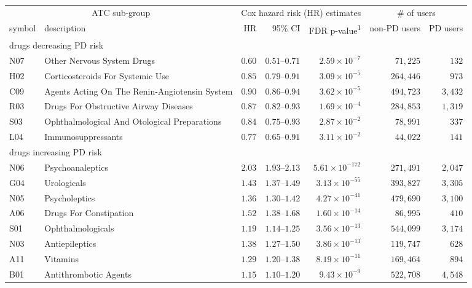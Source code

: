 \setlength{\LTpost}{0mm}
\begin{longtable}{llrrrrr}
\toprule
\multicolumn{2}{c}{ATC sub-group} & \multicolumn{3}{c}{Cox hazard risk (HR) estimates} & \multicolumn{2}{c}{\# of users} \\ 
\cmidrule(lr){1-2} \cmidrule(lr){3-5} \cmidrule(lr){6-7}
symbol & description & HR & 95\% CI & FDR p-value\textsuperscript{1} & non-PD users & PD users \\ 
\midrule
\multicolumn{7}{l}{drugs decreasing PD risk} \\ 
\midrule
N07 & Other Nervous System Drugs & $0.60$ & $0.51$–$0.71$ & $2.59 \times 10^{-7}$ & $71,225$ & $132$ \\ 
H02 & Corticosteroids For Systemic Use & $0.85$ & $0.79$–$0.91$ & $3.09 \times 10^{-5}$ & $264,446$ & $973$ \\ 
C09 & Agents Acting On The Renin-Angiotensin System & $0.90$ & $0.86$–$0.94$ & $3.62 \times 10^{-5}$ & $494,723$ & $3,432$ \\ 
R03 & Drugs For Obstructive Airway Diseases & $0.87$ & $0.82$–$0.93$ & $1.69 \times 10^{-4}$ & $284,853$ & $1,319$ \\ 
S03 & Ophthalmological And Otological Preparations & $0.84$ & $0.75$–$0.93$ & $2.87 \times 10^{-2}$ & $78,991$ & $337$ \\ 
L04 & Immunosuppressants & $0.77$ & $0.65$–$0.91$ & $3.11 \times 10^{-2}$ & $44,022$ & $141$ \\ 
\midrule
\multicolumn{7}{l}{drugs increasing PD risk} \\ 
\midrule
N06 & Psychoanaleptics & $2.03$ & $1.93$–$2.13$ & $5.61 \times 10^{-172}$ & $271,491$ & $2,047$ \\ 
G04 & Urologicals & $1.43$ & $1.37$–$1.49$ & $3.13 \times 10^{-55}$ & $393,827$ & $3,305$ \\ 
N05 & Psycholeptics & $1.36$ & $1.30$–$1.42$ & $4.27 \times 10^{-41}$ & $479,690$ & $3,100$ \\ 
A06 & Drugs For Constipation & $1.52$ & $1.38$–$1.68$ & $1.60 \times 10^{-14}$ & $86,995$ & $410$ \\ 
S01 & Ophthalmologicals & $1.19$ & $1.14$–$1.25$ & $3.56 \times 10^{-13}$ & $544,099$ & $3,174$ \\ 
N03 & Antiepileptics & $1.38$ & $1.27$–$1.50$ & $3.86 \times 10^{-13}$ & $119,747$ & $628$ \\ 
A11 & Vitamins & $1.29$ & $1.20$–$1.38$ & $8.19 \times 10^{-11}$ & $169,464$ & $894$ \\ 
B01 & Antithrombotic Agents & $1.15$ & $1.10$–$1.20$ & $9.43 \times 10^{-9}$ & $522,708$ & $4,548$ \\ 

\end{longtable}
